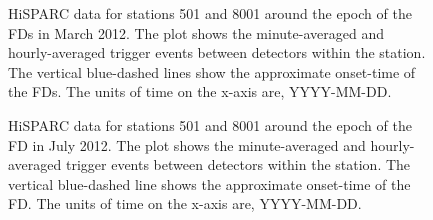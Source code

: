 \begin{figure}[ht]
	\centering
	
	\caption{HiSPARC data for stations 501 and 8001 around the epoch of the FDs in March 2012. The plot shows the minute-averaged and hourly-averaged trigger events between detectors within the station. The vertical blue-dashed lines show the approximate onset-time of the FDs. The units of time on the x-axis are, YYYY-MM-DD.}
	\label{fig:FD_201203}
\end{figure}

\begin{figure}[ht]
	\centering
	
	\caption{HiSPARC data for stations 501 and 8001 around the epoch of the FD in July 2012. The plot shows the minute-averaged and hourly-averaged trigger events between detectors within the station. The vertical blue-dashed line shows the approximate onset-time of the FD. The units of time on the x-axis are, YYYY-MM-DD.}
	\label{fig:FD_201207}
\end{figure}

